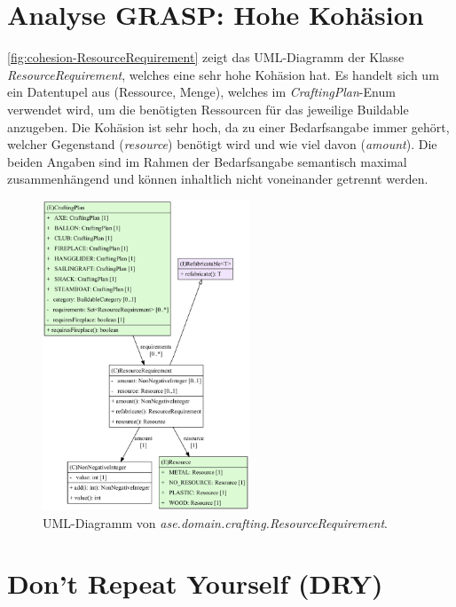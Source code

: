 \section{Analyse GRASP: Hohe Kohäsion}

\autoref{fig:cohesion-ResourceRequirement} zeigt das UML-Diagramm der Klasse \textit{ResourceRequirement}, 
welches eine sehr hohe Kohäsion hat. Es handelt sich um ein Datentupel aus (Ressource, Menge), 
welches im \textit{CraftingPlan}-Enum verwendet wird, um die benötigten Ressourcen für das jeweilige 
Buildable anzugeben. Die Kohäsion ist sehr hoch, da zu einer Bedarfsangabe immer gehört, welcher Gegenstand 
(\textit{resource}) benötigt wird und wie viel davon (\textit{amount}). Die beiden Angaben sind im Rahmen der 
Bedarfsangabe semantisch maximal zusammenhängend und können inhaltlich nicht voneinander getrennt werden.   

\begin{figure}[H]
	\centering
	\includegraphics[width=0.55\textwidth]{Bilder/ResourceRequirement_structure.pdf} 
	\caption{UML-Diagramm von \textit{ase.domain.crafting.ResourceRequirement}.}
	\label{fig:cohesion-ResourceRequirement}
\end{figure} 


\section{Don't Repeat Yourself (DRY)}

